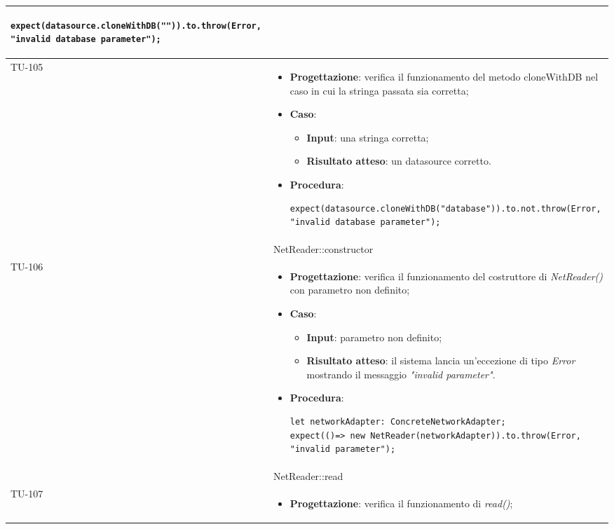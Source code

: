 \begin{longtable}{|C{1.5cm}|C{14.5cm}|}
\begin{itemize}
\begin{lstlisting}
expect(datasource.cloneWithDB("")).to.throw(Error, "invalid database parameter");
	\end{lstlisting}
\end{itemize}\\
\hline
{TU-105} &
\begin{itemize}
	\item \textbf{Progettazione}: verifica il funzionamento del metodo cloneWithDB nel caso in cui la stringa passata sia corretta;
	\item \textbf{Caso}: 
	\begin{itemize}
		\item \textbf{Input}: una stringa corretta;
		\item \textbf{Risultato atteso}: un datasource corretto.
	\end{itemize}
	\item \textbf{Procedura}:
	\begin{lstlisting}
expect(datasource.cloneWithDB("database")).to.not.throw(Error, "invalid database parameter");
	\end{lstlisting}
\end{itemize}\\
\hline
{} & NetReader::constructor
\\ \hline
{TU-106} &
\begin{itemize}
	\item \textbf{Progettazione}: verifica il funzionamento del costruttore di \emph{NetReader()} con parametro non definito;
	\item \textbf{Caso}: 
	\begin{itemize}
		\item \textbf{Input}: parametro non definito;
		\item \textbf{Risultato atteso}: il sistema lancia un'eccezione di tipo \emph{Error} mostrando il messaggio \emph{"invalid parameter"}.
	\end{itemize}
	\item \textbf{Procedura}:
	\begin{lstlisting}
let networkAdapter: ConcreteNetworkAdapter;
expect(()=> new NetReader(networkAdapter)).to.throw(Error, "invalid parameter");
	\end{lstlisting}
\end{itemize}\\
\hline
{} & NetReader::read
\\ \hline
{TU-107} &
\begin{itemize}
	\item \textbf{Progettazione}: verifica il funzionamento di \emph{read()};

\end{itemize}
\end{longtable}
